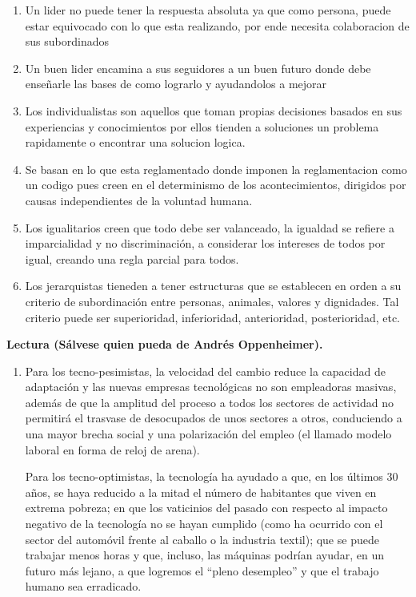\documentclass{article}
\begin{document}
\begin{multicols}{2}
\begin{enumerate}
\item  Un lider no puede tener la respuesta absoluta ya que como persona, puede estar equivocado con lo que esta realizando, por ende necesita colaboracion de sus subordinados
\item   Un buen lider encamina a sus seguidores a un buen futuro donde debe enseñarle las bases de como lograrlo y ayudandolos a mejorar
\item   Los individualistas son aquellos que toman propias decisiones basados en sus experiencias y conocimientos por ellos tienden a soluciones un problema rapidamente o encontrar una solucion logica.
\item  Se basan en lo que esta reglamentado donde imponen la reglamentacion como un codigo pues creen en el determinismo de los acontecimientos, dirigidos por causas independientes de la voluntad humana.
\item  Los igualitarios creen que todo debe ser valanceado, la igualdad se refiere a imparcialidad y no discriminación, a considerar los intereses de todos por igual, creando una regla parcial para todos.
\item   Los jerarquistas tieneden a tener estructuras que se establecen en orden a su criterio de subordinación entre personas, animales, valores y dignidades. Tal criterio puede ser superioridad, inferioridad, anterioridad, posterioridad, etc.
\end{enumerate}


\textbf{Lectura (Sálvese quien pueda de Andrés Oppenheimer).}
\begin{enumerate}
\item Para los tecno-pesimistas, la velocidad del cambio reduce la capacidad de adaptación y las nuevas empresas tecnológicas no son empleadoras masivas, además de que la amplitud del proceso a todos los sectores de actividad no permitirá el trasvase de desocupados de unos sectores a otros, conduciendo a una mayor brecha social y una polarización del empleo (el llamado modelo laboral en forma de reloj de arena).

Para los tecno-optimistas, la tecnología ha ayudado a que, en los últimos 30 años, se haya
reducido a la mitad el número de habitantes que viven en extrema pobreza; en que los vaticinios del pasado con respecto al impacto negativo de la tecnología no se hayan cumplido (como ha ocurrido con el sector del automóvil frente al caballo o la industria textil); que se puede trabajar menos horas y que, incluso, las máquinas podrían ayudar, en un futuro más lejano, a que logremos el “pleno desempleo” y que el trabajo humano sea erradicado.


\end{enumerate}
\end{multicols}
\end{document}
